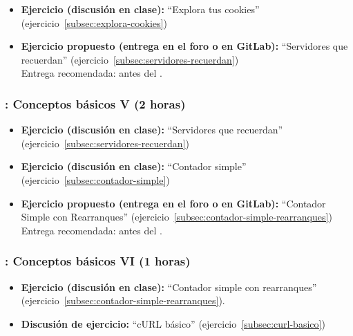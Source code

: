 \documentclass[a4paper,12pt]{article}
\begin{document}
\begin{itemize}
\item \textbf{Ejercicio (discusión en clase):} ``Explora tus cookies'' (ejercicio~\ref{subsec:explora-cookies}) 
\item \textbf{Ejercicio propuesto (entrega en el foro o en GitLab):} ``Servidores que recuerdan'' (ejercicio~\ref{subsec:servidores-recuerdan}) \\
  Entrega recomendada: antes del \juevesE.
\end{itemize}

\subsubsection{\juevesE: Conceptos básicos V (2 horas)}
\label{cal:juevesE}

\begin{itemize}
\item \textbf{Ejercicio (discusión en clase):} ``Servidores que recuerdan'' (ejercicio~\ref{subsec:servidores-recuerdan}) 
\item \textbf{Ejercicio (discusión en clase):} ``Contador simple'' (ejercicio~\ref{subsec:contador-simple})
\item \textbf{Ejercicio propuesto (entrega en el foro o en GitLab):} ``Contador Simple con Rearranques'' (ejercicio~\ref{subsec:contador-simple-rearranques})
 \\
  Entrega recomendada: antes del \juevesF.
\end{itemize}

\subsubsection{\juevesF: Conceptos básicos VI (1 horas)}
\label{cal:juevesF}

\begin{itemize}
\item \textbf{Ejercicio (discusión en clase):} ``Contador simple con rearranques'' (ejercicio~\ref{subsec:contador-simple-rearranques}).
\item \textbf{Discusión de ejercicio:} ``cURL básico'' (ejercicio~\ref{subsec:curl-basico})
\end{itemize}
\end{document}
